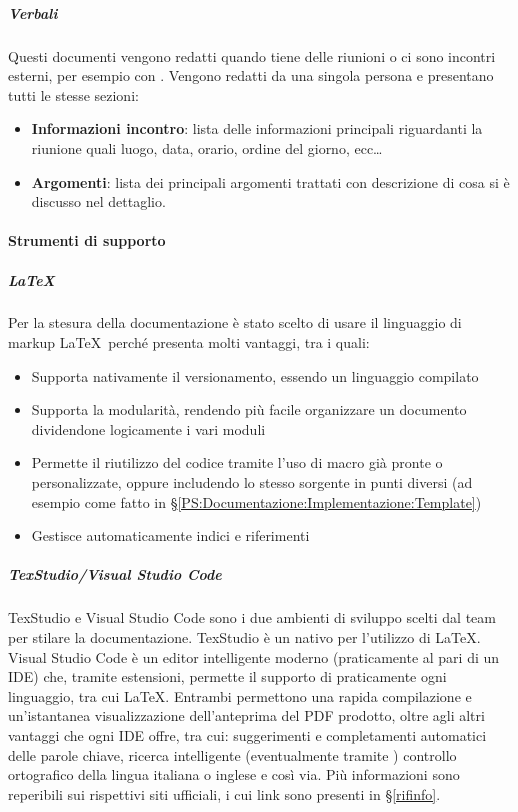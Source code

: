 

			\subparagraph{Verbali}
			Questi documenti vengono redatti quando \gruppo tiene delle riunioni o ci sono incontri esterni, per esempio con \II. Vengono redatti da una singola persona
			e presentano tutti le stesse sezioni:
			\begin{itemize}
				\item \textbf{Informazioni incontro}: lista delle informazioni principali riguardanti la riunione quali luogo, data, orario, ordine del giorno, ecc\dots
				\item \textbf{Argomenti}: lista dei principali argomenti trattati con descrizione di cosa si è discusso nel dettaglio.
			\end{itemize}


			\paragraph{Strumenti di supporto}

			\subparagraph{\LaTeX} \label{LaTeX}
			Per la stesura della documentazione è stato scelto di usare il linguaggio di markup \LaTeX \ perché presenta molti vantaggi, tra i quali:
			\begin{itemize}
				\item Supporta nativamente il versionamento, essendo un linguaggio compilato
				\item Supporta la modularità, rendendo più facile organizzare un documento dividendone logicamente i vari moduli
				\item Permette il riutilizzo del codice tramite l'uso di macro già pronte o personalizzate, oppure includendo lo stesso sorgente in punti diversi
					(ad esempio come fatto in \S\ref{PS:Documentazione:Implementazione:Template})
				\item Gestisce automaticamente indici e riferimenti
			\end{itemize}

			\subparagraph{TexStudio/Visual Studio Code}
			TexStudio e Visual Studio Code sono i due ambienti di sviluppo scelti dal team per stilare la documentazione.
			TexStudio è un  nativo per l'utilizzo di \LaTeX. Visual Studio Code è un editor intelligente moderno (praticamente al pari di un IDE) che, tramite
			estensioni, permette il supporto di praticamente ogni linguaggio, tra cui \LaTeX.
			Entrambi permettono una rapida compilazione e un'istantanea visualizzazione dell'anteprima del PDF prodotto, oltre agli altri vantaggi che ogni IDE offre,
			tra cui: suggerimenti e completamenti automatici delle parole chiave, ricerca intelligente (eventualmente tramite ) controllo ortografico della
			lingua italiana o inglese e così via. Più informazioni sono reperibili sui rispettivi siti ufficiali, i cui link sono presenti in \S\ref{rifinfo}.

